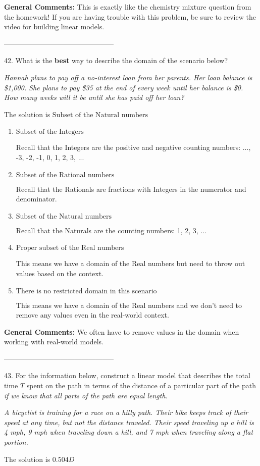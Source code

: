 \documentclass{article}[14pt]
\begin{document}
\textbf{General Comments:} This is exactly like the chemistry mixture question from the homework! If you are having trouble with this problem, be sure to review the video for building linear models.

-----------------------------------------------

42. What is the \textbf{best} way to describe the domain of the scenario below?
\begin{center} \textit{Hannah plans to pay off a no-interest loan from her parents. Her loan balance is \$1,000. She plans to pay \$35 at the end of every week until her balance is \$0. How many weeks will it be until she has paid off her loan?} \end{center} 
The solution is $ \text{Subset of the Natural numbers} $ 

\begin{enumerate}[label=\Alph*.] 
\item $ \text{Subset of the Integers} $ 

 Recall that the Integers are the positive and negative counting numbers: ..., -3, -2, -1, 0, 1, 2, 3, ...  
\item $ \text{Subset of the Rational numbers} $ 

 Recall that the Rationals are fractions with Integers in the numerator and denominator. 
\item $ \text{Subset of the Natural numbers} $ 

 Recall that the Naturals are the counting numbers: 1, 2, 3, ... 
\item $ \text{Proper subset of the Real numbers} $ 

 This means we have a domain of the Real numbers but need to throw out values based on the context. 
\item $ \text{There is no restricted domain in this scenario} $ 

 This means we have a domain of the Real numbers and we don't need to remove any values even in the real-world context. 
\end{enumerate} 
 
\textbf{General Comments:} We often have to remove values in the domain when working with real-world models.

-----------------------------------------------

43. For the information below, construct a linear model that describes the total time $T$ spent on the path in terms of the distance of a particular part of the path \textit{if we know that all parts of the path are equal length}.
\begin{center} \textit{A bicyclist is training for a race on a hilly path. Their bike keeps track of their speed at any time, but not the distance traveled. Their speed traveling up a hill is 4 mph, 9 mph when traveling down a hill, and 7 mph when traveling along a flat portion.} \end{center} 
The solution is $ 0.504 D $ 
\end{document}
